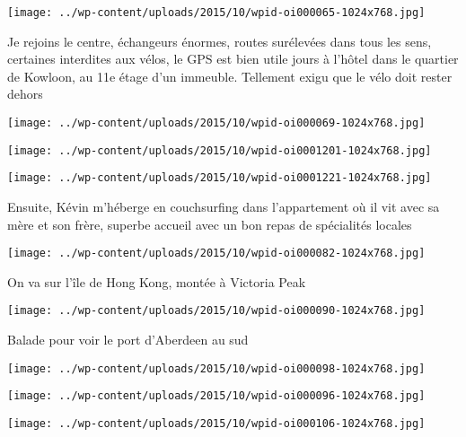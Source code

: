  \newline
\centerline{\texttt{[image: ../wp-content/uploads/2015/10/wpid-oi000065-1024x768.jpg]} } 
 \newline
 Je rejoins le centre, échangeurs énormes, routes surélevées dans tous les sens, certaines interdites aux vélos, le GPS est bien utile  jours à l'hôtel dans le quartier de Kowloon, au 11e étage d'un immeuble. Tellement exigu que le vélo doit rester dehors \newline
 \newline
\centerline{\texttt{[image: ../wp-content/uploads/2015/10/wpid-oi000069-1024x768.jpg]} } 
 \newline
 \newline
\centerline{\texttt{[image: ../wp-content/uploads/2015/10/wpid-oi0001201-1024x768.jpg]} } 
 \newline
 \newline
\centerline{\texttt{[image: ../wp-content/uploads/2015/10/wpid-oi0001221-1024x768.jpg]} } 
 \newline
 Ensuite, Kévin m'héberge en couchsurfing dans l'appartement où il vit avec sa mère et son frère, superbe accueil avec un bon repas de spécialités locales \newline
 \newline
\centerline{\texttt{[image: ../wp-content/uploads/2015/10/wpid-oi000082-1024x768.jpg]} } 
 \newline
 On va sur l'île de Hong Kong, montée à Victoria Peak \newline
 \newline
\centerline{\texttt{[image: ../wp-content/uploads/2015/10/wpid-oi000090-1024x768.jpg]} } 
 \newline
 Balade pour voir le port d'Aberdeen au sud \newline
 \newline
\centerline{\texttt{[image: ../wp-content/uploads/2015/10/wpid-oi000098-1024x768.jpg]} } 
 \newline
 \newline
\centerline{\texttt{[image: ../wp-content/uploads/2015/10/wpid-oi000096-1024x768.jpg]} } 
 \newline
 \newline
\centerline{\texttt{[image: ../wp-content/uploads/2015/10/wpid-oi000106-1024x768.jpg]} } 
 \newline
